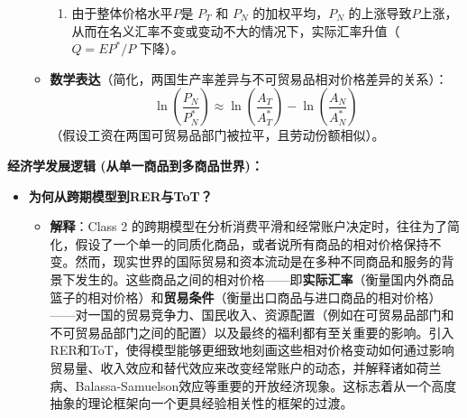 \documentclass[12pt]{article}
\begin{document}
\begin{itemize}
\begin{itemize}
\begin{enumerate}
            \item 由于整体价格水平$P$是 $P_T$ 和 $P_N$ 的加权平均，$P_N$ 的上涨导致$P$上涨，从而在名义汇率不变或变动不大的情况下，实际汇率升值（$Q = EP^*/P$ 下降）。
        \end{enumerate}
        \item \textbf{数学表达}（简化，两国生产率差异与不可贸易品相对价格差异的关系）：
        \[
        \ln\left(\frac{P_N}{P_N^*}\right) \approx \ln\left(\frac{A_T}{A_T^*}\right) - \ln\left(\frac{A_N}{A_N^*}\right)
        \]
        （假设工资在两国可贸易品部门被拉平，且劳动份额相似）。
    \end{itemize}
\end{itemize}

\textbf{经济学发展逻辑 (从单一商品到多商品世界)：}
\begin{itemize}
    \item \textbf{为何从跨期模型到RER与ToT？}
    \begin{itemize}
        \item \textbf{解释}：Class 2  的跨期模型在分析消费平滑和经常账户决定时，往往为了简化，假设了一个单一的同质化商品，或者说所有商品的相对价格保持不变。然而，现实世界的国际贸易和资本流动是在多种不同商品和服务的背景下发生的。这些商品之间的相对价格——即\textbf{实际汇率}（衡量国内外商品篮子的相对价格）和\textbf{贸易条件}（衡量出口商品与进口商品的相对价格）——对一国的贸易竞争力、国民收入、资源配置（例如在可贸易品部门和不可贸易品部门之间的配置）以及最终的福利都有至关重要的影响。引入RER和ToT，使得模型能够更细致地刻画这些相对价格变动如何通过影响贸易量、收入效应和替代效应来改变经常账户的动态，并解释诸如荷兰病、Balassa-Samuelson效应等重要的开放经济现象。这标志着从一个高度抽象的理论框架向一个更具经验相关性的框架的过渡。
    \end{itemize}
\end{itemize}
\end{document}
